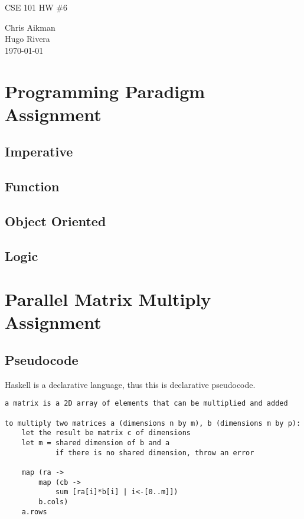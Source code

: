 \documentclass[hidelinks,12pt]{article}
\begin{document}
\sf

\begin{titlepage}
\begin{center}
\Huge {CSE 101 HW \#6}\\
[1cm]
\normalsize

Chris Aikman\\
Hugo Rivera\\
[1cm]

{\today}

\end{center}
\end{titlepage}

\newpage

\section{Programming Paradigm Assignment}
\subsection{Imperative}
\subsection{Function}
\subsection{Object Oriented}
\subsection{Logic}

\section{Parallel Matrix Multiply Assignment}
\subsection{Pseudocode}
Haskell is a declarative language, thus this is declarative pseudocode.

\begin{verbatim}
a matrix is a 2D array of elements that can be multiplied and added

to multiply two matrices a (dimensions n by m), b (dimensions m by p):
    let the result be matrix c of dimensions
    let m = shared dimension of b and a
            if there is no shared dimension, throw an error

    map (ra ->
        map (cb ->
            sum [ra[i]*b[i] | i<-[0..m]])
        b.cols)
    a.rows
\end{verbatim}
\end{document}
